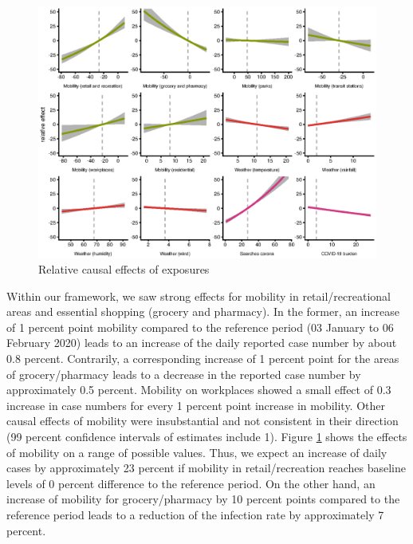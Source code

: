 \documentclass[]{elsarticle} %
\makeatletter
\def\maxwidth{\ifdim\Gin@nat@width>\linewidth\linewidth
\else\Gin@nat@width\fi}
\let\Oldincludegraphics\includegraphics
\renewcommand{\includegraphics}[1]{\Oldincludegraphics[width=\maxwidth]{#1}}
\makeatother
\begin{document}
\begin{figure}
\centering
\includegraphics{figures/f_exposure_vs_effect.eps}
\caption{\label{fig:effectsrange}Relative causal effects of exposures}
\end{figure}

Within our framework, we saw strong effects for mobility in
retail/recreational areas and essential shopping (grocery and pharmacy).
In the former, an increase of 1 percent point mobility compared to the
reference period (03 January to 06 February 2020) leads to an increase
of the daily reported case number by about 0.8 percent. Contrarily, a
corresponding increase of 1 percent point for the areas of
grocery/pharmacy leads to a decrease in the reported case number by
approximately 0.5 percent. Mobility on workplaces showed a small effect
of 0.3 increase in case numbers for every 1 percent point increase in
mobility. Other causal effects of mobility were insubstantial and not
consistent in their direction (99 percent confidence intervals of
estimates include 1). Figure \ref{fig:effectsrange} shows the effects of
mobility on a range of possible values. Thus, we expect an increase of
daily cases by approximately 23 percent if mobility in retail/recreation
reaches baseline levels of 0 percent difference to the reference period.
On the other hand, an increase of mobility for grocery/pharmacy by 10
percent points compared to the reference period leads to a reduction of
the infection rate by approximately 7 percent.
\end{document}
